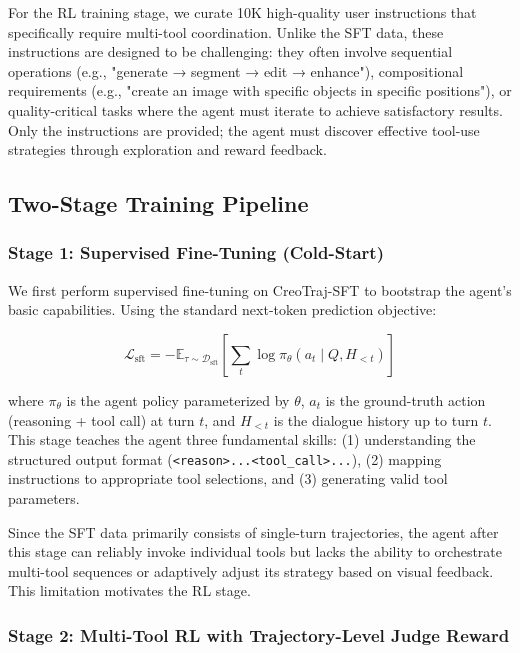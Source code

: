 \documentclass{article}
\begin{document}
For the RL training stage, we curate 10K high-quality user instructions that specifically require multi-tool coordination. Unlike the SFT data, these instructions are designed to be challenging: they often involve sequential operations (e.g., "generate → segment → edit → enhance"), compositional requirements (e.g., "create an image with specific objects in specific positions"), or quality-critical tasks where the agent must iterate to achieve satisfactory results. Only the instructions are provided; the agent must discover effective tool-use strategies through exploration and reward feedback.

\subsection{Two-Stage Training Pipeline}

\subsubsection{Stage 1: Supervised Fine-Tuning (Cold-Start)}

We first perform supervised fine-tuning on CreoTraj-SFT to bootstrap the agent's basic capabilities. Using the standard next-token prediction objective:

$$\mathcal{L}_{\text{sft}} = -\mathbb{E}_{\tau \sim \mathcal{D}_{\text{sft}}} \left[ \sum_{t} \log \pi_\theta(a_t \mid Q, H_{<t}) \right]$$

where $\pi_\theta$ is the agent policy parameterized by $\theta$, $a_t$ is the ground-truth action (reasoning + tool call) at turn $t$, and $H_{<t}$ is the dialogue history up to turn $t$. This stage teaches the agent three fundamental skills: (1) understanding the structured output format (\texttt{<reason>...<tool\_call>...}), (2) mapping instructions to appropriate tool selections, and (3) generating valid tool parameters.

Since the SFT data primarily consists of single-turn trajectories, the agent after this stage can reliably invoke individual tools but lacks the ability to orchestrate multi-tool sequences or adaptively adjust its strategy based on visual feedback. This limitation motivates the RL stage.

\subsubsection{Stage 2: Multi-Tool RL with Trajectory-Level Judge Reward}

\label{sec:rl}
\end{document}

